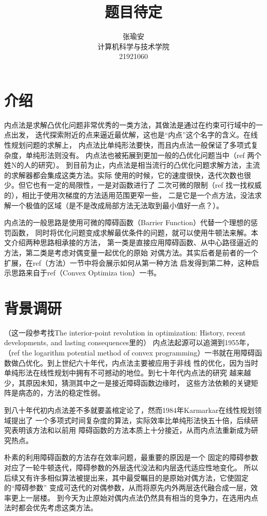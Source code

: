 \documentclass{article}
\title{题目待定}
\author{张瑜安\\ 计算机科学与技术学院 \\21921060}
\date{}
\begin{document}
\maketitle
\section{介绍}
内点法是求解凸优化问题非常优秀的一类方法，其做法是通过在约束可行域中的一点出发，
迭代探索附近的点来逼近最优解，这也是“内点”这个名字的含义。在线性规划问题的求解上，
内点法比单纯形法要快，而且内点法一般保证了多项式复杂度，单纯形法则没有。
内点法也被拓展到更加一般的凸优化问题当中（ref 两个姓N的人的研究）。
到目前为止，内点法是相当流行的凸优化问题求解方法，主流的求解器都会集成这类方法。实际
使用的时候，它的速度很快，迭代次数也很少。但它也有一定的局限性，一是对函数进行了
二次可微的限制（ref 找一找权威的），相比于使用次梯度的方法适用范围更窄一些，
二是它是一个点方法，没法求解一个极值的区域（是不是改成局部方法无法取到最小值好一点？）。

内点法的一般思路是使用可微的障碍函数（Barrier Function）代替一个理想的惩罚函数，
同时将优化问题变成求解最优条件的问题，就可以使用牛顿法来解。本文介绍两种思路相承接的方法，
第一类是直接应用障碍函数、从中心路径逼近的方法，第二类是考虑对偶变量一起优化的原始
对偶方法。其实后者是前者的一个扩展，在ref（方法）一节中将会展示如何从第一种方法
启发得到第二种，这种启示思路来自于ref（Convex Optimiza tion）一书。


\section{背景调研}
（这一段参考找The interior-point revolution in optimization: History, recent developments, and lasting consequences里的）
内点法起源可以追溯到1955年，（ref the logarithm potential method of convex 
programming）一书就在用障碍函数做凸优化。到上世纪六十年代，内点法主要被应用于非线
性的优化，因为当时单纯形法在线性规划中拥有不可撼动的地位。到七十年代内点法的研究
越来越少，其原因未知，猜测其中之一是接近障碍函数边缘时，
这些方法依赖的关键矩阵是病态的，方法的稳定性弱。

到八十年代初内点法差不多就要盖棺定论了，然而1984年Karmarkar在线性规划领域提出了
一个多项式时间复杂度的算法，实际效率比单纯形法快五十倍，后续研究表明该方法和以前用
障碍函数的方法本质上十分接近，从而内点法重新成为研究热点。

朴素的利用障碍函数的方法存在效率问题，最重要的原因是一个
固定的障碍参数对应了一轮牛顿迭代，障碍参数的外层迭代没法和内层迭代适应性地变化。
所以后续又有许多相似算法被提出来，其中最受瞩目的是原始对偶方法，它使固定的“障碍参数”
变成可迭代的对偶参数，从而将原先内外两层迭代融合成一层，效率更上一层楼。
到今天为止原始对偶内点法仍然具有相当的竞争力，在选用内点法时都会优先考虑这类方法。
\end{document}
